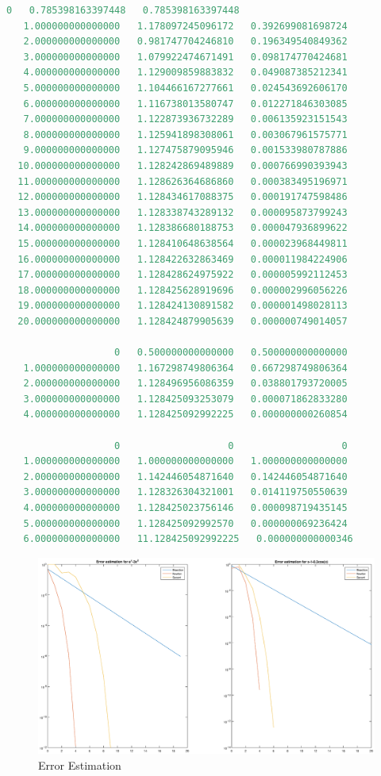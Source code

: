 \begin{lstlisting}[language = MATLAB]
                   0   0.785398163397448   0.785398163397448
   1.000000000000000   1.178097245096172   0.392699081698724
   2.000000000000000   0.981747704246810   0.196349540849362
   3.000000000000000   1.079922474671491   0.098174770424681
   4.000000000000000   1.129009859883832   0.049087385212341
   5.000000000000000   1.104466167277661   0.024543692606170
   6.000000000000000   1.116738013580747   0.012271846303085
   7.000000000000000   1.122873936732289   0.006135923151543
   8.000000000000000   1.125941898308061   0.003067961575771
   9.000000000000000   1.127475879095946   0.001533980787886
  10.000000000000000   1.128242869489889   0.000766990393943
  11.000000000000000   1.128626364686860   0.000383495196971
  12.000000000000000   1.128434617088375   0.000191747598486
  13.000000000000000   1.128338743289132   0.000095873799243
  14.000000000000000   1.128386680188753   0.000047936899622
  15.000000000000000   1.128410648638564   0.000023968449811
  16.000000000000000   1.128422632863469   0.000011984224906
  17.000000000000000   1.128428624975922   0.000005992112453
  18.000000000000000   1.128425628919696   0.000002996056226
  19.000000000000000   1.128424130891582   0.000001498028113
  20.000000000000000   1.128424879905639   0.000000749014057

                   0   0.500000000000000   0.500000000000000
   1.000000000000000   1.167298749806364   0.667298749806364
   2.000000000000000   1.128496956086359   0.038801793720005
   3.000000000000000   1.128425093253079   0.000071862833280
   4.000000000000000   1.128425092992225   0.000000000260854

                   0                   0                   0
   1.000000000000000   1.000000000000000   1.000000000000000
   2.000000000000000   1.142446054871640   0.142446054871640
   3.000000000000000   1.128326304321001   0.014119750550639
   4.000000000000000   1.128425023756146   0.000098719435145
   5.000000000000000   1.128425092992570   0.000000069236424
   6.000000000000000   11.128425092992225   0.000000000000346
\end{lstlisting}
\begin{figure}[!htb]
\includegraphics[width = 18cm]{res.eps}
\caption{Error Estimation}
\label{Figure 1}
\end{figure}


